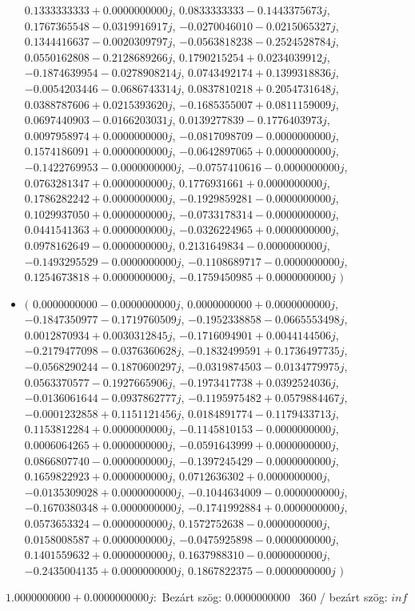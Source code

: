 \documentclass[14pt,a4paper]{article}
\begin{document}
\begin{itemize}
$0.1333333333+0.0000000000j$, $0.0833333333-0.1443375673j$, $0.1767365548-0.0319916917j$, $-0.0270046010-0.0215065327j$, $0.1344416637-0.0020309797j$, $-0.0563818238-0.2524528784j$, $0.0550162808-0.2128689266j$, $0.1790215254+0.0234039912j$, $-0.1874639954-0.0278908214j$, $0.0743492174+0.1399318836j$, $-0.0054203446-0.0686743314j$, $0.0837810218+0.2054731648j$, $0.0388787606+0.0215393620j$, $-0.1685355007+0.0811159009j$, $0.0697440903-0.0166203031j$, $0.0139277839-0.1776403973j$, $0.0097958974+0.0000000000j$, $-0.0817098709-0.0000000000j$, $0.1574186091+0.0000000000j$, $-0.0642897065+0.0000000000j$, $-0.1422769953-0.0000000000j$, $-0.0757410616-0.0000000000j$, $0.0763281347+0.0000000000j$, $0.1776931661+0.0000000000j$, $0.1786282242+0.0000000000j$, $-0.1929859281-0.0000000000j$, $0.1029937050+0.0000000000j$, $-0.0733178314-0.0000000000j$, $0.0441541363+0.0000000000j$, $-0.0326224965+0.0000000000j$, $0.0978162649-0.0000000000j$, $0.2131649834-0.0000000000j$, $-0.1493295529-0.0000000000j$, $-0.1108689717-0.0000000000j$, $0.1254673818+0.0000000000j$, $-0.1759450985+0.0000000000j$
$\big)$
\item
$\big($
$0.0000000000-0.0000000000j$, $0.0000000000+0.0000000000j$, $-0.1847350977-0.1719760509j$, $-0.1952338858-0.0665553498j$, $0.0012870934+0.0030312845j$, $-0.1716094901+0.0044144506j$, $-0.2179477098-0.0376360628j$, $-0.1832499591+0.1736497735j$, $-0.0568290244-0.1870600297j$, $-0.0319874503-0.0134779975j$, $0.0563370577-0.1927665906j$, $-0.1973417738+0.0392524036j$, $-0.0136061644-0.0937862777j$, $-0.1195975482+0.0579884467j$, $-0.0001232858+0.1151121456j$, $0.0184891774-0.1179433713j$, $0.1153812284+0.0000000000j$, $-0.1145810153-0.0000000000j$, $0.0006064265+0.0000000000j$, $-0.0591643999+0.0000000000j$, $0.0866807740-0.0000000000j$, $-0.1397245429-0.0000000000j$, $0.1659822923+0.0000000000j$, $0.0712636302+0.0000000000j$, $-0.0135309028+0.0000000000j$, $-0.1044634009-0.0000000000j$, $-0.1670380348+0.0000000000j$, $-0.1741992884+0.0000000000j$, $0.0573653324-0.0000000000j$, $0.1572752638-0.0000000000j$, $0.0158008587+0.0000000000j$, $-0.0475925898-0.0000000000j$, $0.1401559632+0.0000000000j$, $0.1637988310-0.0000000000j$, $-0.2435004135+0.0000000000j$, $0.1867822375-0.0000000000j$
$\big)$
\end{itemize}
$1.0000000000+0.0000000000j$:\
Bezárt szög: $0.0000000000$ \
360 / bezárt szög: $inf$\
\end{document}
